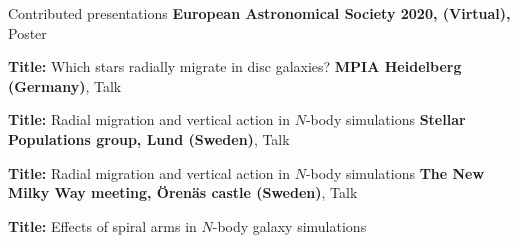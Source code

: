 \begin{rubric}{Contributed presentations}
%
\textbf{European Astronomical Society 2020, (Virtual),} Poster \par
\textbf{Title:} Which stars radially migrate in disc galaxies?
%
\entry*[6 May 2020]%
\textbf{MPIA Heidelberg (Germany)}, Talk \par
\textbf{Title:} Radial migration and vertical action in $N$-body simulations
%
\entry*[5 May 2020]%
\textbf{Stellar Populations group, Lund (Sweden)}, Talk \par
\textbf{Title:} Radial migration and vertical action in $N$-body simulations
%
\entry*[27 May 2019]%
\textbf{The New Milky Way meeting, Örenäs castle (Sweden)}, Talk \par
\textbf{Title:} Effects of spiral arms in $N$-body galaxy simulations
%
%
\end{rubric}
